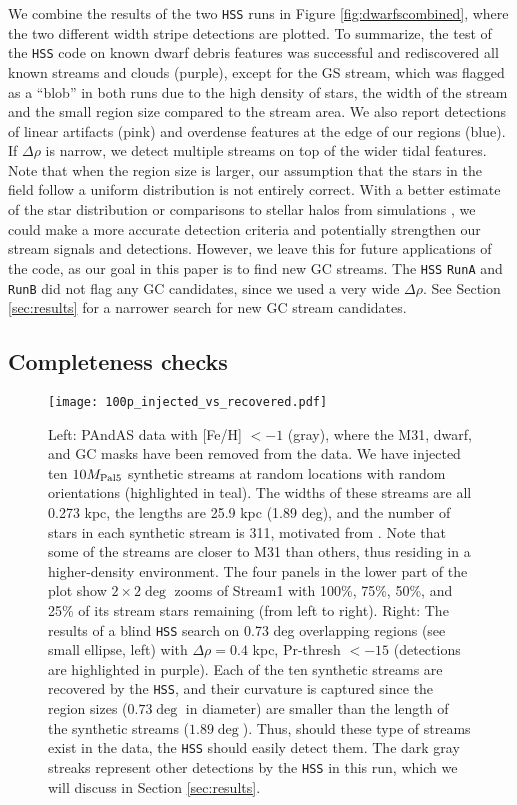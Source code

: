 \documentclass[twocolumn]{aastex631}
\begin{document}
We combine the results of the two \texttt{HSS} runs in Figure \ref{fig:dwarfscombined}, where the two different width stripe detections are plotted. 
To summarize, the test of the \texttt{HSS} code on known dwarf debris features was successful and rediscovered all known streams and clouds (purple), except for the GS stream, which was flagged as a ``blob'' in both runs due to the high density of stars, the width of the stream and the small region size compared to the stream area. We also report detections of linear artifacts (pink) and  overdense features at the edge of our regions (blue). If  $\Delta \rho$ is narrow, we detect multiple streams on top of the wider tidal features.  Note that when the region size is larger, our assumption that the stars in the field follow a uniform distribution is not entirely correct. With a better estimate of the star distribution or comparisons to stellar halos from simulations \citep[e.g.,][]{bullock05}, we could make a more accurate detection criteria and potentially strengthen our stream signals and detections. However, we leave this for future applications of the code, as our goal in this paper is to find new GC streams. The \texttt{HSS} \texttt{RunA} and \texttt{RunB} did not flag any GC candidates, since we used a very wide $\Delta\rho$. See Section \ref{sec:results} for a narrower search for new GC stream candidates. 



\subsection{Completeness checks}\label{sec:completeness}
\begin{figure*}
\centerline{\texttt{[image: 100p\_injected\_vs\_recovered.pdf]}}
\caption{Left: PAndAS data with [Fe/H] $<-1$ (gray), where the M31, dwarf, and GC masks have been removed from the data. We have injected ten $10{M}_{\rm Pal 5}$ synthetic streams at random locations with random orientations (highlighted in teal). The widths of these streams are all 0.273 kpc, the lengths are 25.9 kpc (1.89 deg), and the number of stars in each synthetic stream is 311, motivated from . Note that some of the streams are closer to M31 than others, thus residing in a higher-density environment. The four panels in the lower part of the plot show $2\times2\deg$ zooms of Stream1 with 100\%, 75\%, 50\%, and 25\% of its stream stars remaining (from left to right).
Right: The results of a blind \texttt{HSS} search on 0.73 deg overlapping regions (see small ellipse, left) with $\Delta \rho = 0.4$ kpc, Pr-thresh $<-15$  (detections are highlighted in purple). Each of the ten synthetic  streams are recovered by the \texttt{HSS}, and their curvature is captured since the region sizes ($0.73 \deg$ in diameter) are smaller than the length of the synthetic streams ($1.89 \deg$). Thus, should these type of streams exist in the data, the \texttt{HSS} should easily detect them. The dark gray streaks represent other detections by the \texttt{HSS} in this run, which we will discuss in Section \ref{sec:results}.}
\label{fig:completness}
\end{figure*}
\end{document}
